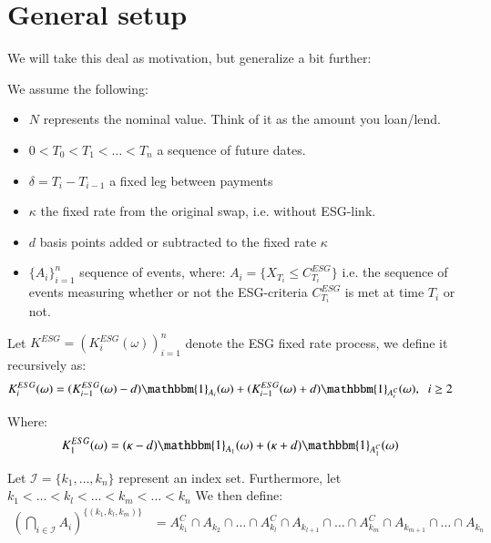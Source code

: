 \newpage 


\section{General setup}
We will take this deal as motivation, but generalize a bit further:
\begin{assumption}
We assume the following: 
\begin{itemize}[leftmargin=*]
    \item $N$ represents the nominal value. Think of it as the amount you loan/lend.
    \item $0 < T_{0} < T_{1} < \dots < T_{n}$ a sequence of future dates. 
    \item $\delta = T_{i} - T_{i-1}$ a fixed leg between payments 
    \item $\kappa$ the fixed rate from the original swap, i.e. without ESG-link. 
    \item $d$ basis points added or subtracted to the fixed rate $\kappa$
    \item $\{A_{i}\}_{i=1}^{n}$ sequence of events, where: 
    $A_{i} = \{X_{T_{i}} \leq C_{T_{i}}^{ESG}\}$ i.e. the sequence of events measuring whether or not the ESG-criteria $C_{T_{i}}^{ESG}$ is met at time $T_{i}$ or not. 
\end{itemize}
\end{assumption} 


\begin{definition}
Let $K^{ESG} = (K_{i}^{ESG}(\omega))_{i=1}^{n}$ 
denote the ESG fixed rate process, we define it recursively as: 
\begin{align*}
K_{i}^{ESG}(\omega) &= (K_{i-1}^{ESG}(\omega)-d)\mathbbm{1}_{A_{i}}(\omega)
+ (K_{i-1}^{ESG}(\omega)+d)\mathbbm{1}_{A_{i}^{C}}(\omega), \;\; i\geq 2
\end{align*}

Where:
\begin{align*}
K_{1}^{ESG}(\omega) &= (\kappa - d)\mathbbm{1}_{A_{1}}(\omega)
+ (\kappa + d)\mathbbm{1}_{A_{1}^{C}}(\omega)    
\end{align*}
\end{definition} 

\begin{notation}
Let $\mathcal{I} = \{k_{1}, \dots, k_{n}\}$ represent an index set. Furthermore, let\\ 
$k_{1}< \dots < k_{l} < \dots < k_{m}< \dots < k_{n}$ We then define:
\begin{align*}
\left(
\bigcap_{i\in \mathcal{I}}A_{i}
\right)^{
\{(k_{1}, k_{l}, k_{m})\}
}
&= 
A_{k_{1}}^{C}\cap A_{k_{2}} \cap \dots\cap A_{k_{l}}^{C}\cap
A_{k_{l+1}}\cap \dots \cap A_{k_{m}}^{C}\cap A_{k_{m+1}}\cap \dots \cap A_{k_{n}}
\end{align*}
\end{notation}

